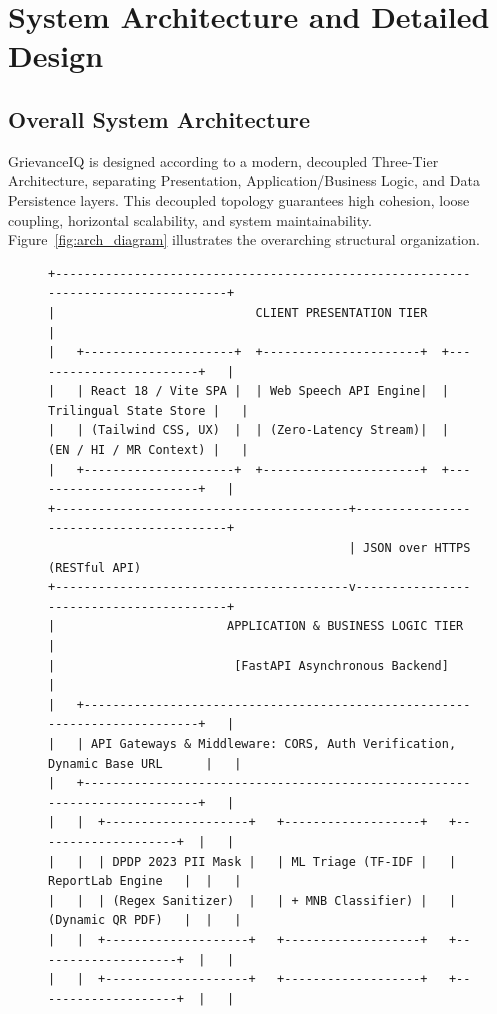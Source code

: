 \chapter{System Architecture and Detailed Design}

\section{Overall System Architecture}
GrievanceIQ is designed according to a modern, decoupled Three-Tier Architecture, separating Presentation, Application/Business Logic, and Data Persistence layers. This decoupled topology guarantees high cohesion, loose coupling, horizontal scalability, and system maintainability. Figure~\ref{fig:arch_diagram} illustrates the overarching structural organization.

\begin{figure}[h]
\centering
\begin{verbatim}
+-----------------------------------------------------------------------------------+
|                            CLIENT PRESENTATION TIER                               |
|   +---------------------+  +----------------------+  +------------------------+   |
|   | React 18 / Vite SPA |  | Web Speech API Engine|  | Trilingual State Store |   |
|   | (Tailwind CSS, UX)  |  | (Zero-Latency Stream)|  | (EN / HI / MR Context) |   |
|   +---------------------+  +----------------------+  +------------------------+   |
+-----------------------------------------+-----------------------------------------+
                                          | JSON over HTTPS (RESTful API)
+-----------------------------------------v-----------------------------------------+
|                        APPLICATION & BUSINESS LOGIC TIER                          |
|                         [FastAPI Asynchronous Backend]                            |
|   +---------------------------------------------------------------------------+   |
|   | API Gateways & Middleware: CORS, Auth Verification, Dynamic Base URL      |   |
|   +---------------------------------------------------------------------------+   |
|   |  +--------------------+   +-------------------+   +--------------------+  |   |
|   |  | DPDP 2023 PII Mask |   | ML Triage (TF-IDF |   | ReportLab Engine   |  |   |
|   |  | (Regex Sanitizer)  |   | + MNB Classifier) |   | (Dynamic QR PDF)   |  |   |
|   |  +--------------------+   +-------------------+   +--------------------+  |   |
|   |  +--------------------+   +-------------------+   +--------------------+  |   |

\end{verbatim}
\end{figure}
